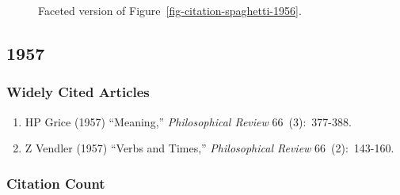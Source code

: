 \documentclass[
  10pt,
  letterpaper,
  DIV=11,
  numbers=noendperiod,
  twoside]{scrartcl}
\providecommand{\tightlist}{%
  \setlength{\itemsep}{0pt}\setlength{\parskip}{0pt}}\usepackage{longtable,booktabs,array}
\begin{document}
\begin{figure}


\caption{\label{fig-citation-facet-1956}Faceted version of
Figure~\ref{fig-citation-spaghetti-1956}.}

\end{figure}%

\newpage

\subsection{1957}\label{sec-s1957}

\subsubsection*{Widely Cited Articles}\label{widely-cited-articles-1}

\begin{enumerate}
\def\labelenumi{\arabic{enumi}.}
\tightlist
\item
  HP Grice (1957) ``Meaning,'' \emph{Philosophical Review}
  66~(3):~377-388.
\item
  Z Vendler (1957) ``Verbs and Times,'' \emph{Philosophical Review}
  66~(2):~143-160.
\end{enumerate}

\subsubsection*{Citation Count}\label{sec-count-1957}
\end{document}
